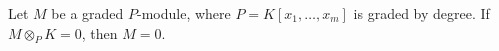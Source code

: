 Let $M$ be a graded $P$-module, where $P = K[x_1, \ldots, x_m]$ is graded by degree. If $M \otimes_P K = 0$, then $M = 0$.
